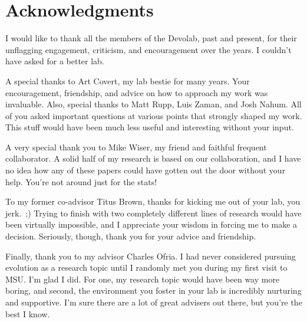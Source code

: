 \documentclass[PhD]{msu-thesis}
\begin{document}
\begin{abstract}

\end{abstract}
%
\clearpage
\makecopyrightpage
\makededicationpage
%
\clearpage
\chapter*{Acknowledgments}
\DoubleSpacing
I would like to thank all the members of the Devolab, past and present, for their unflagging engagement, criticism, and encouragement over the years. I couldn't have asked for a better lab.

A special thanks to Art Covert, my lab bestie for many years. Your encouragement, friendship, and advice on how to approach my work was invaluable. Also, special thanks to Matt Rupp, Luis Zaman, and Josh Nahum. All of you asked important questions at various points that strongly shaped my work. This stuff would have been much less useful and interesting without your input.

A very special thank you to Mike Wiser, my friend and faithful frequent collaborator. A solid half of my research is based on our collaboration, and I have no idea how any of these papers could have gotten out the door without your help. You're not around just for the stats!

To my former co-advisor Titus Brown, thanks for kicking me out of your lab, you jerk.~;) Trying to finish with two completely different lines of research would have been virtually impossible, and I appreciate your wisdom in forcing me to make a decision. Seriously, though, thank you for your advice and friendship.

Finally, thank you to my advisor Charles Ofria. I had never considered pursuing evolution as a research topic until I randomly met you during my first visit to MSU. I'm glad I did. For one, my research topic would have been way more boring, and second, the environment you foster in your lab is incredibly nurturing and supportive. I'm sure there are a lot of great advisers out there, but you're the best I know.
%
\clearpage
\SingleSpacing
\tableofcontents*
\clearpage
\listoftables
\clearpage
\listoffigures
%
\clearpage
\end{document}
